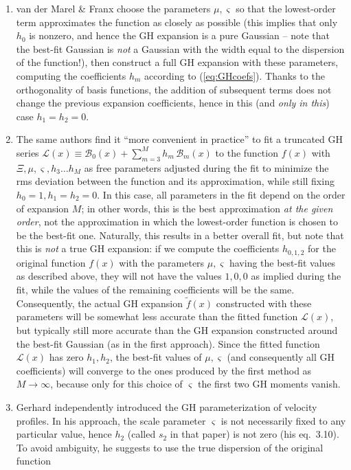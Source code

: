 \documentclass[12pt]{article}
\begin{document}
\begin{enumerate}
\item van der Marel \& Franx \cite{vdMarelFranx1993} choose the parameters $\mu, \varsigma$ so that the lowest-order term approximates the function as closely as possible (this implies that only $h_0$ is nonzero, and hence the GH expansion is a pure Gaussian -- note that the best-fit Gaussian is \textit{not} a Gaussian with the width equal to the dispersion of the function!), then construct a full GH expansion with these parameters, computing the coefficients $h_m$ according to (\ref{eq:GHcoefs}). Thanks to the orthogonality of basis functions, the addition of subsequent terms does not change the previous expansion coefficients, hence in this (and \textit{only in this}) case $h_1=h_2=0$.
\item The same authors find it ``more convenient in practice'' to fit a truncated GH series $\mathscr L(x) \equiv \mathcal B_0(x) + \sum_{m=3}^M h_m\,\mathcal B_m(x)$ to the function $f(x)$ with $\Xi, \mu, \varsigma, h_3 \dots h_M$ as free parameters adjusted during the fit to minimize the rms deviation between the function and its approximation, while still fixing $h_0=1, h_1=h_2=0$.
In this case, all parameters in the fit depend on the order of expansion $M$; in other words, this is the best approximation \textit{at the given order}, not the approximation in which the lowest-order function is chosen to be the best-fit one. Naturally, this results in a better overall fit, but note that this is \textit{not} a true GH expansion: if we compute the coefficients $h_{0,1,2}$ for the original function $f(x)$ with the parameters $\mu,\varsigma$ having the best-fit values as described above, they will not have the values $1,0,0$ as implied during the fit, while the values of the remaining coefficients will be the same. Consequently, the actual GH expansion $\tilde f(x)$ constructed with these parameters will be somewhat less accurate than the fitted function $\mathscr L(x)$, but typically still more accurate than the GH expansion constructed around the best-fit Gaussian (as in the first approach). 
Since the fitted function $\mathscr L(x)$ has zero $h_1,h_2$, the best-fit values of $\mu,\varsigma$ (and consequently all GH coefficients) will converge to the ones produced by the first method as $M \to \infty$, because only for this choice of $\varsigma$ the first two GH moments vanish.
\item Gerhard \cite{Gerhard1993} independently introduced the GH parameterization of velocity profiles. In his approach, the scale parameter $\varsigma$ is not necessarily fixed to any particular value, hence $h_2$ (called $s_2$ in that paper) is not zero (his eq.~3.10). To avoid ambiguity, he suggests to use the true dispersion of the original function%

\end{enumerate}
\end{document}
